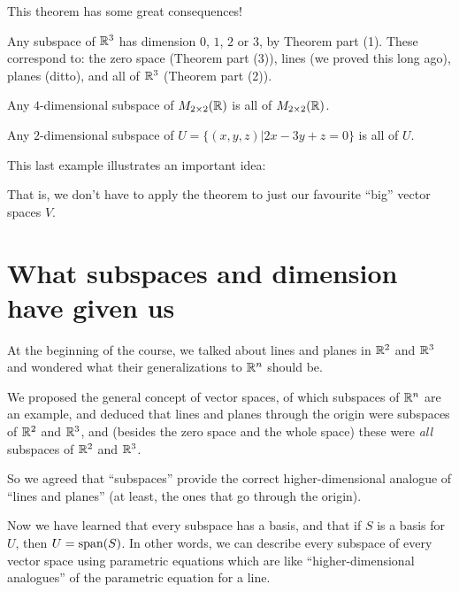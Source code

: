 This theorem has some great consequences!

\begin{myexample} Any subspace of $\mathbb{R}^3$ has dimension $0$, $1$, $2$ or $3$,
by Theorem part (1).  These correspond to: the zero space (Theorem part (3)),
lines (we proved this long ago), planes (ditto), and all of $\mathbb{R}^3$ (Theorem part (2)). \end{myexample}

\begin{myexample} Any $4$-dimensional subspace of $M_{2\times 2}(\mathbb{R})$ is all
of  $M_{2\times 2}(\mathbb{R})$.   \end{myexample}

\begin{myexample}
Any $2$-dimensional subspace of $U = \{(x,y,z) | 2x-3y+z = 0\}$ 
is all of $U$.  \end{myexample}

This last example illustrates an important idea:


That is, we don't have to apply the theorem to just our favourite ``big''
vector spaces $V$.

\section{What subspaces and dimension have given us}

At the beginning of the course, we talked about lines and planes
in $\mathbb{R}^2$ and $\mathbb{R}^3$ and wondered what their generalizations to
$\mathbb{R}^n$ should be.

We proposed the general concept of vector spaces, of which subspaces
of $\mathbb{R}^n$ are an example, and deduced that lines and planes through
the origin were subspaces of $\mathbb{R}^2$ and $\mathbb{R}^3$, and (besides the
zero space and the whole space) these were \emph{all} subspaces of
$\mathbb{R}^2$ and $\mathbb{R}^3$.

So we agreed that ``subspaces'' provide the correct higher-dimensional
analogue of ``lines and planes'' (at least, the ones that go through the origin).

Now we have learned that every subspace has a basis, and that if $S$
is a basis for $U$, then $U = \textrm{span}(S)$.  In other words, we can
describe every subspace of every vector space using parametric
equations which are like ``higher-dimensional analogues'' of the
parametric equation for a line.

